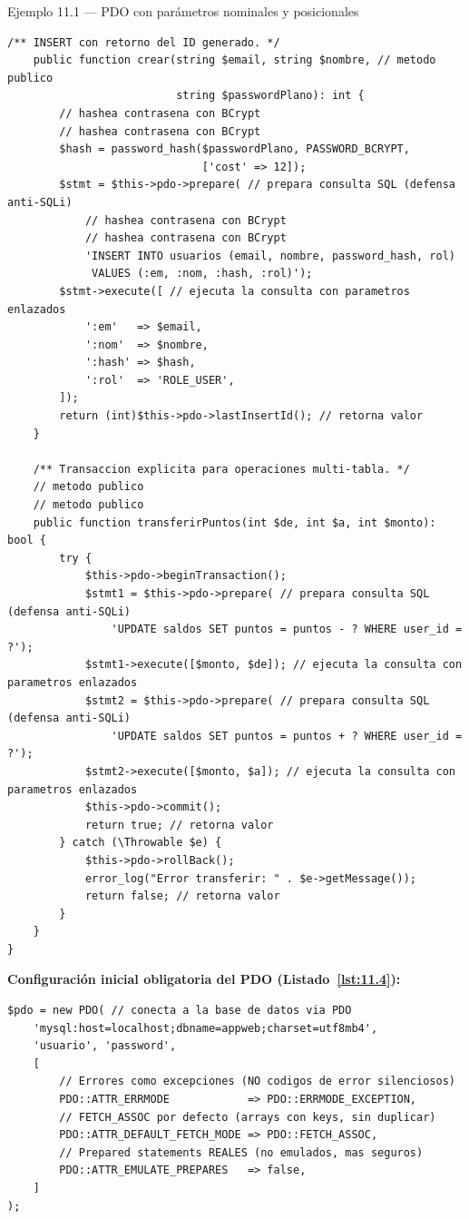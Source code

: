 \begin{cajaejemplo}{Ejemplo 11.1 --- PDO con parámetros nominales y posicionales}
\begin{lstlisting}[style=php,caption={UsuarioRepository.php},label=lst:11.3]
    /** INSERT con retorno del ID generado. */
    public function crear(string $email, string $nombre, // metodo publico
                          string $passwordPlano): int {
        // hashea contrasena con BCrypt
        // hashea contrasena con BCrypt
        $hash = password_hash($passwordPlano, PASSWORD_BCRYPT,
                              ['cost' => 12]);
        $stmt = $this->pdo->prepare( // prepara consulta SQL (defensa anti-SQLi)
            // hashea contrasena con BCrypt
            // hashea contrasena con BCrypt
            'INSERT INTO usuarios (email, nombre, password_hash, rol)
             VALUES (:em, :nom, :hash, :rol)');
        $stmt->execute([ // ejecuta la consulta con parametros enlazados
            ':em'   => $email,
            ':nom'  => $nombre,
            ':hash' => $hash,
            ':rol'  => 'ROLE_USER',
        ]);
        return (int)$this->pdo->lastInsertId(); // retorna valor
    }

    /** Transaccion explicita para operaciones multi-tabla. */
    // metodo publico
    // metodo publico
    public function transferirPuntos(int $de, int $a, int $monto): bool {
        try {
            $this->pdo->beginTransaction();
            $stmt1 = $this->pdo->prepare( // prepara consulta SQL (defensa anti-SQLi)
                'UPDATE saldos SET puntos = puntos - ? WHERE user_id = ?');
            $stmt1->execute([$monto, $de]); // ejecuta la consulta con parametros enlazados
            $stmt2 = $this->pdo->prepare( // prepara consulta SQL (defensa anti-SQLi)
                'UPDATE saldos SET puntos = puntos + ? WHERE user_id = ?');
            $stmt2->execute([$monto, $a]); // ejecuta la consulta con parametros enlazados
            $this->pdo->commit();
            return true; // retorna valor
        } catch (\Throwable $e) {
            $this->pdo->rollBack();
            error_log("Error transferir: " . $e->getMessage());
            return false; // retorna valor
        }
    }
}
\end{lstlisting}

\textbf{Configuración inicial obligatoria del PDO (Listado~\ref{lst:11.4}):}
\begin{lstlisting}[style=php,numbers=none,caption={Ejemplo de PHP},label=lst:11.4]
$pdo = new PDO( // conecta a la base de datos via PDO
    'mysql:host=localhost;dbname=appweb;charset=utf8mb4',
    'usuario', 'password',
    [
        // Errores como excepciones (NO codigos de error silenciosos)
        PDO::ATTR_ERRMODE            => PDO::ERRMODE_EXCEPTION,
        // FETCH_ASSOC por defecto (arrays con keys, sin duplicar)
        PDO::ATTR_DEFAULT_FETCH_MODE => PDO::FETCH_ASSOC,
        // Prepared statements REALES (no emulados, mas seguros)
        PDO::ATTR_EMULATE_PREPARES   => false,
    ]
);
\end{lstlisting}
\end{cajaejemplo}

